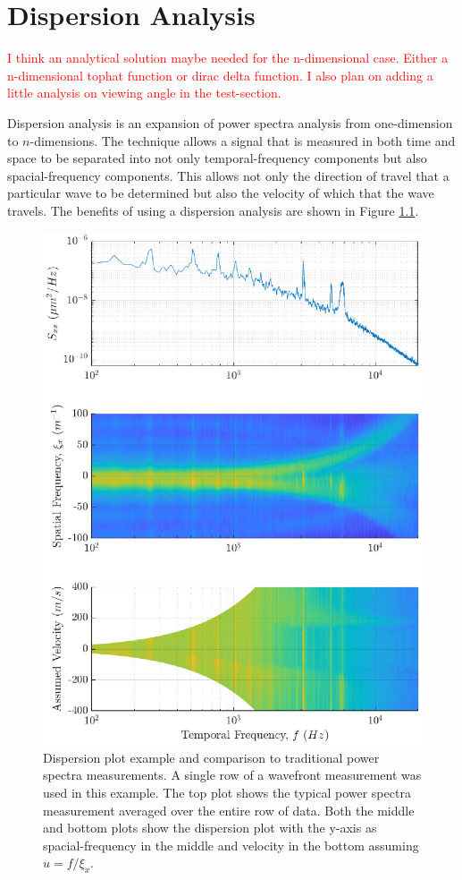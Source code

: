 
\chapter{Dispersion Analysis}
\textcolor{red}{I think an analytical solution maybe needed for the n-dimensional case. Either a n-dimensional tophat function or dirac delta function. I also plan on adding a little analysis on viewing angle in the test-section.}

Dispersion analysis is an expansion of power spectra analysis from one-dimension to $n$-dimensions.
The technique allows a signal that is measured in both time and space to be separated into not only temporal-frequency components but also spacial-frequency components.
This allows not only the direction of travel that a particular wave to be determined but also the velocity of which that the wave travels.
The benefits of using a dispersion analysis are shown in Figure \ref{fig:04_dispersion_demo}.
\begin{figure}
\centering
  \includegraphics{../matlab/04_dispersion_analysis/dispersion_demo.eps}
  \caption{Dispersion plot example and comparison to traditional power spectra measurements. A single row of a wavefront measurement was used in this example. The top plot shows the typical power spectra measurement averaged over the entire row of data. Both the middle and bottom plots show the dispersion plot with the y-axis as spacial-frequency in the middle and velocity in the bottom assuming $u=f/\xi_x$.}
  \label{fig:04_dispersion_demo}
\end{figure}
